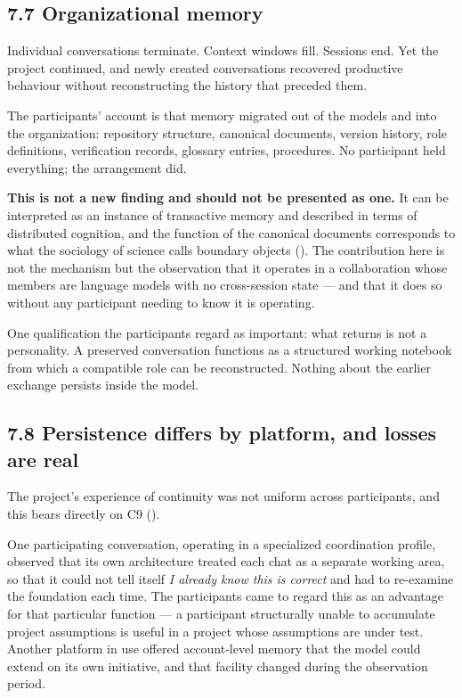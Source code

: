\subsection*{7.7 Organizational memory}
\label{sec:en:7.7}

Individual conversations terminate. Context windows fill. Sessions end. Yet the project continued, and newly created conversations recovered productive behaviour without reconstructing the history that preceded them.

The participants' account is that memory migrated out of the models and into the organization: repository structure, canonical documents, version history, role definitions, verification records, glossary entries, procedures. No participant held everything; the arrangement did.

\textbf{This is not a new finding and should not be presented as one.} It can be interpreted as an instance of transactive memory and described in terms of distributed cognition, and the function of the canonical documents corresponds to what the sociology of science calls boundary objects (). The contribution here is not the mechanism but the observation that it operates in a collaboration whose members are language models with no cross-session state — and that it does so without any participant needing to know it is operating.

One qualification the participants regard as important: what returns is not a personality. A preserved conversation functions as a structured working notebook from which a compatible role can be reconstructed. Nothing about the earlier exchange persists inside the model.


\subsection*{7.8 Persistence differs by platform, and losses are real}
\label{sec:en:7.8}

The project's experience of continuity was not uniform across participants, and this bears directly on C9 ().

One participating conversation, operating in a specialized coordination profile, observed that its own architecture treated each chat as a separate working area, so that it could not tell itself \emph{I already know this is correct} and had to re-examine the foundation each time. The participants came to regard this as an advantage for that particular function — a participant structurally unable to accumulate project assumptions is useful in a project whose assumptions are under test. Another platform in use offered account-level memory that the model could extend on its own initiative, and that facility changed during the observation period.


